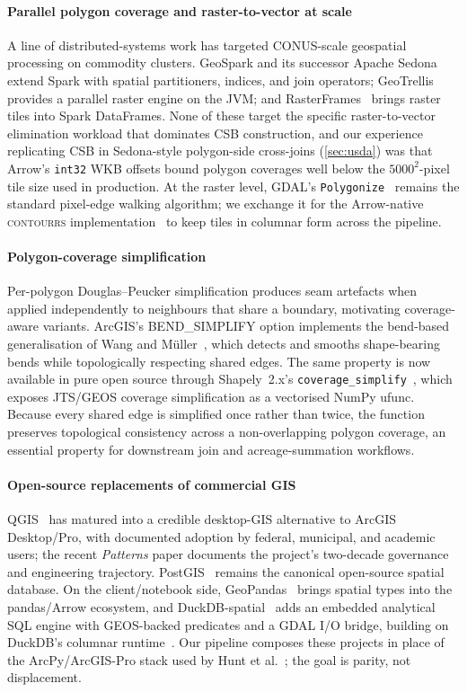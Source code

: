 \documentclass[preprint,12pt]{elsarticle}
\begin{document}
\paragraph{Parallel polygon coverage and raster-to-vector at scale}
A line of distributed-systems work has targeted CONUS-scale geospatial
processing on commodity clusters. GeoSpark and its successor Apache
Sedona~\cite{yu2019sedona} extend Spark with spatial partitioners,
indices, and join operators; GeoTrellis~\cite{geotrellis} provides a
parallel raster engine on the JVM; and RasterFrames~\cite{rasterframes}
brings raster tiles into Spark DataFrames. None of these target the
specific raster-to-vector elimination workload that dominates CSB
construction, and our experience replicating CSB in Sedona-style
polygon-side cross-joins (\cref{sec:usda}) was that Arrow's
\texttt{int32} WKB offsets bound polygon coverages well below the
$5000^2$-pixel tile size used in production. At the raster level,
GDAL's \texttt{Polygonize}~\cite{gdal} remains the standard pixel-edge
walking algorithm; we exchange it for the Arrow-native
\textsc{contourrs} implementation~\cite{contourrs} to keep tiles in
columnar form across the pipeline.

\paragraph{Polygon-coverage simplification}
Per-polygon Douglas--Peucker simplification produces seam artefacts when
applied independently to neighbours that share a boundary, motivating
coverage-aware variants. ArcGIS's \textsc{BEND\_SIMPLIFY} option
implements the bend-based generalisation of Wang and
M\"uller~\cite{wang1998bend}, which detects and smooths shape-bearing
bends while topologically respecting shared edges. The same property
is now available in pure open source through Shapely~2.x's
\texttt{coverage\_simplify}~\cite{shapely,gillies2024shapely2}, which
exposes JTS/GEOS coverage simplification as a vectorised NumPy ufunc.
Because every shared edge is simplified once rather than twice, the
function preserves topological consistency across a non-overlapping
polygon coverage, an essential property for downstream join and
acreage-summation workflows.

\paragraph{Open-source replacements of commercial GIS}
QGIS~\cite{qgis2025patterns} has matured into a credible
desktop-GIS alternative to ArcGIS Desktop/Pro, with documented adoption
by federal, municipal, and academic users; the recent \emph{Patterns}
paper documents the project's two-decade governance and engineering
trajectory. PostGIS~\cite{obe2021postgis} remains the canonical
open-source spatial database. On the client/notebook side,
GeoPandas~\cite{jordahl2020geopandas} brings spatial types into the
pandas/Arrow ecosystem, and DuckDB-spatial~\cite{duckdbspatial} adds an
embedded analytical SQL engine with GEOS-backed predicates and a GDAL
I/O bridge, building on DuckDB's columnar
runtime~\cite{raasveldt2019duckdb}. Our pipeline composes these
projects in place of the ArcPy/ArcGIS-Pro stack used by Hunt et
al.~\cite{hunt2024csb}; the goal is parity, not displacement.
\end{document}
